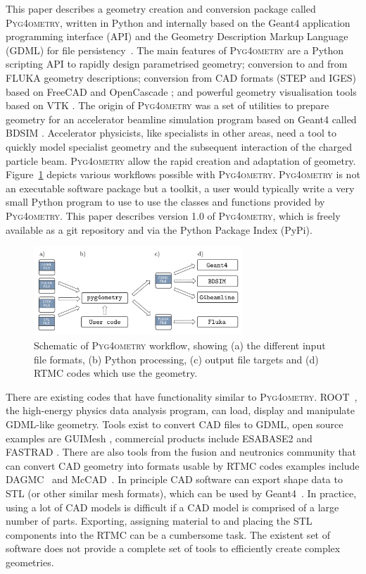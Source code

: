 \documentclass[final,5p,times,twocolumn]{elsarticle}
\newcommand{\PYGEOMETRY}{\textsc{Pyg4ometry}}
\begin{document}
This paper describes a geometry creation and conversion package called \PYGEOMETRY{}, written in Python and internally based on the Geant4 application programming interface (API) and the Geometry Description Markup Language (GDML) for file persistency~\cite{GDML}. The main features of \PYGEOMETRY{} are a Python scripting API to rapidly design parametrised geometry; conversion to and from  FLUKA geometry descriptions; conversion from CAD formats  (STEP and IGES) based on FreeCAD \cite{FreeCAD} and OpenCascade \cite{OpenCASCADE}; and powerful geometry visualisation tools based on VTK \cite{VTK4}. The origin of \PYGEOMETRY{} was a set of utilities to prepare geometry for an accelerator beamline simulation program based on Geant4 called BDSIM \cite{BDSIM_Nevay}. Accelerator physicists, like specialists in other areas, need a tool to quickly model specialist geometry and the subsequent interaction of the charged particle beam. \PYGEOMETRY{} allow the rapid creation and 
adaptation of geometry. Figure~\ref{fig:workflow} depicts various workflows possible with \PYGEOMETRY{}. \PYGEOMETRY{} is not an executable software package but a toolkit, a user would typically write a very small Python program to use to use the classes and functions provided by \PYGEOMETRY{}. This paper describes version 1.0 of \PYGEOMETRY{}, which is freely available as a git repository and via the Python Package Index (PyPi).

\begin{figure}[hbt!]
  \normalsize
  \centering
  \includegraphics[width=0.7\textwidth]{./diagrams/workflow.pdf}
  \caption{\label{fig:workflow}Schematic of \PYGEOMETRY{} workflow, showing (a) the different input file formats, (b) Python processing, (c) output file targets and (d) RTMC codes which use the geometry. }
\end{figure}

There are existing codes that have functionality similar to \PYGEOMETRY{}. ROOT~\cite{Brun:1997pa}, the high-energy physics data analysis program, can load, display and manipulate GDML-like geometry. Tools exist to convert CAD files to GDML, open source examples are GUIMesh \cite{GUIMesh_Pinto}, commercial products include ESABASE2 \cite{ESABASE2} and FASTRAD \cite{FASTRAD}. There are also tools from the fusion and 
neutronics community that can convert CAD geometry into formats usable by RTMC codes examples include DAGMC~\cite{DAGMC} and McCAD~\cite{McCad}.  
In principle CAD software can export shape data to STL (or other similar mesh formats), which can be used by Geant4~\cite{poole2012acad}. In practice, using a lot of CAD models is difficult if a CAD model is comprised of a large number of parts. Exporting, assigning material to and placing the STL components into the RTMC can be a cumbersome task. The existent set of software does not provide a complete set of tools to efficiently create complex geometries.
\end{document}
